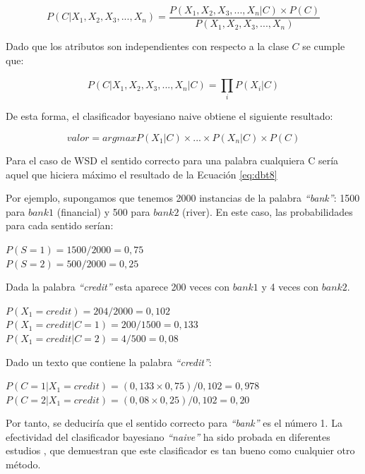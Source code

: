 \begin{itemize}
  \begin{equation}
    P(C|X_1,X_2,X_3,...,X_n)=\frac{P(X_1,X_2,X_3,...,X_n|C)\times P(C)}{P(X_1,X_2,X_3,...,X_n)}
    \label{eq:dbt6}
  \end{equation}

  Dado que los atributos son independientes con respecto a la clase $C$ se cumple que:

  \begin{equation}
    P(C|X_1,X_2,X_3,...,X_n|C)=\prod_{i}^{}P(X_i|C)
    \label{eq:dbt7}
  \end{equation}

  De esta forma, el clasificador bayesiano naive obtiene el siguiente resultado:

  \begin{equation}
    valor=arg max P(X_1|C)\times ... \times P(X_n|C) \times P(C)
    \label{eq:dbt8}
  \end{equation}

  Para el caso de WSD el sentido correcto para una palabra cualquiera C sería aquel que hiciera máximo el resultado de la Ecuación \ref{eq:dbt8}

  Por ejemplo, supongamos que tenemos 2000 instancias de la palabra \textit{“bank”}: 1500 para $bank1$ (financial) y 500 para $bank2$ (river). En este caso, las probabilidades para cada sentido serían:

  \begin{center}
  $P(S=1)=1500/2000=0,75$\\
  $P(S=2)=500/2000=0,25$
  \end{center}

  Dada la palabra \textit{“credit”} esta aparece 200 veces con $bank1$ y 4 veces con $bank2$.

  \begin{center}
    $P(X_1=credit)=204/2000=0,102$\\
    $P(X_1=credit|C=1)=200/1500=0,133$\\
    $P(X_1=credit|C=2)=4/500=0,08$
  \end{center}

  Dado un texto que contiene la palabra \textit{“credit”}:

  \begin{center}
    $P(C=1|X_1=credit)=(0,133 \times 0,75)/0,102=0,978$\\
    $P(C=2|X_1=credit)=(0,08 \times 0,25)/0,102=0,20$
  \end{center}

  Por tanto, se deduciría que el sentido correcto para \textit{“bank”} es el número 1. La efectividad del clasificador bayesiano \textit{“naive”} ha sido probada en diferentes estudios \cite{025}, \cite{026} que demuestran que este clasificador es tan bueno como cualquier otro método.


\end{itemize}
